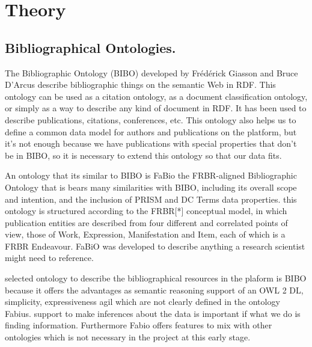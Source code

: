 \documentclass[11pt]{article}
\begin{document}
\section{Theory}
\subsection{Bibliographical Ontologies.}
The Bibliographic Ontology (BIBO) \cite{bibo} developed by Fr\'ed\'erick Giasson and Bruce D’Arcus describe bibliographic things on the semantic Web in RDF. This ontology can be used as a citation ontology, as a document classification ontology, or simply as a way to describe any kind of document in RDF. It has been used to describe publications, citations, conferences, etc. This ontology also helps us to define a common data model for authors and publications on the platform, but it's not enough because we have publications with special properties that don't be in BIBO, so it is necessary to extend this ontology so that our data fits. 

An ontology that its similar to BIBO is  FaBio the FRBR-aligned \cite{o2011frbr} Bibliographic Ontology that is bears many similarities with BIBO, including its overall scope and intention, and the inclusion of PRISM and DC Terms data properties.  this ontology is structured according to the FRBR[*] conceptual model, in which publication entities are described from four different and correlated points of view, those of Work, Expression, Manifestation and Item, each of which is a FRBR Endeavour. FaBiO was developed to describe anything a research scientist might need to reference.

selected ontology to describe the bibliographical resources in the plaform is BIBO because it offers the advantages as semantic reasoning support of an OWL 2 DL, simplicity, expressiveness agil which are not clearly defined in the ontology Fabius. support to make inferences about the data is important if what we do is finding information. Furthermore Fabio offers features to mix with other ontologies which is not necessary in the project at this early stage.
\end{document}
